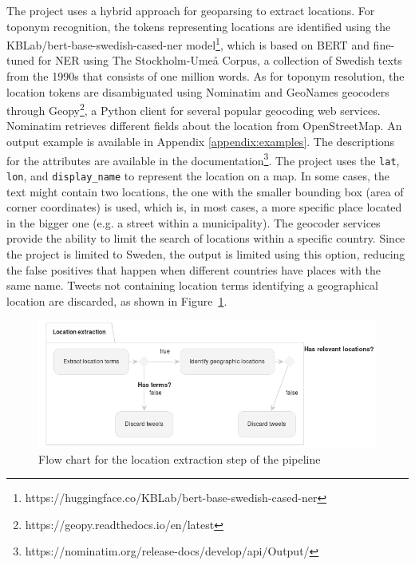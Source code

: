 The project uses a hybrid approach for geoparsing to extract locations. For toponym recognition, the
tokens representing locations are identified using the KBLab/bert-base-swedish-cased-ner
model\footnote{https://huggingface.co/KBLab/bert-base-swedish-cased-ner}, which is based on BERT and
fine-tuned for \ac{NER} using The Stockholm-Umeå Corpus, a collection of Swedish texts from the
1990s that consists of one million words. As for toponym resolution, the location tokens are
disambiguated using Nominatim and GeoNames geocoders through
Geopy\footnote{https://geopy.readthedocs.io/en/latest}, a Python client for several popular
geocoding web services. Nominatim retrieves different fields about the location from OpenStreetMap.
An output example is available in Appendix \ref{appendix:examples}. The descriptions for the
attributes are available in the
documentation\footnote{https://nominatim.org/release-docs/develop/api/Output/}. The project uses the
\texttt{lat}, \texttt{lon}, and \texttt{display\_name} to represent the location on a map. In some cases, the text might
contain two locations, the one with the smaller bounding box (area of corner coordinates) is used,
which is, in most cases, a more specific place located in the bigger one (e.g. a street within a
municipality). The geocoder services provide the ability to limit the search of locations within a
specific country. Since the project is limited to Sweden, the output is limited using this option,
reducing the false positives that happen when different countries have places with the same name.
Tweets not containing location terms identifying a geographical location are discarded, as shown in
Figure~\ref{fig:flow_chart_location_extraction}.

\begin{figure}[H]
  \begin{center}
    \includegraphics[width=\columnwidth]{./images/location_extraction.png}
  \end{center}
  \caption{Flow chart for the location extraction step of the pipeline}
  \label{fig:flow_chart_location_extraction}
\end{figure}


